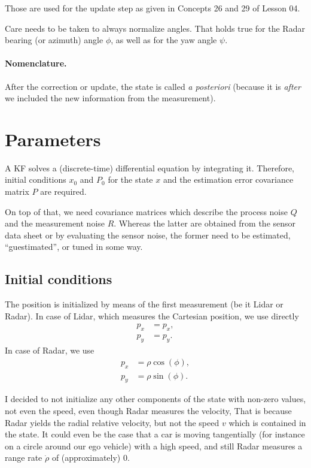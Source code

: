 \documentclass{scrartcl}
\begin{document}
Those are used for the update step as given in Concepts 26 and 29 of Lesson 04.

Care needs to be taken to always normalize angles. That holds true for
the Radar bearing (or azimuth) angle $\phi$, as well as for the yaw angle $\psi$.

\paragraph{Nomenclature.}
After the correction or update, the state is called \emph{a posteriori}
(because it is \emph{after} we included the new information
from the measurement).

\section{Parameters}
A KF solves a (discrete-time) differential equation by integrating it.
Therefore, initial conditions $x_0$ and $P_0$
for the state $x$ and the estimation error
covariance matrix $P$ are required.

On top of that, we need covariance matrices which describe the
process noise $Q$ and the measurement noise $R$.
Whereas the latter are obtained from the sensor data sheet or
by evaluating the sensor noise, the former need to be estimated,
``guestimated'', or tuned in some way.

\subsection{Initial conditions}
The position is initialized by means of the first measurement
(be it Lidar or Radar).
In case of Lidar, which measures the Cartesian position, we use directly
\begin{align*}
	p_x &= p_x, \\
	p_y &= p_y.
\end{align*}
In case of Radar, we use
\begin{align*}
	p_x &= \rho \cos(\phi), \\
	p_y &= \rho \sin(\phi).
\end{align*}

I decided to not initialize any other components of the state with non-zero values,
not even the speed,
even though Radar measures the velocity,
That is because Radar yields the radial relative velocity,
but not the speed $v$ which is contained in the state.
It could even be the case that a car is moving tangentially (for instance
on a circle around our ego vehicle) with a high speed,
and still Radar measures a range rate $\dot{\rho}$ of (approximately) 0.
\end{document}
